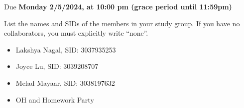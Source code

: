 \documentclass[11pt]{article}
\def\duedate{Monday 2/5/2024, at 10:00 pm (grace period until 11:59pm)}
\begin{document}
\maketitle
Due \textbf{\duedate}

List the names and SIDs of the members in your study group.
If you have no collaborators, you must explicitly write ``none''.

\begin{solution}
\begin{itemize}
    \item Lakshya Nagal, SID: 3037935253
    \item Joyce Lu, SID: 3039208707
    \item Melad Mayaar, SID: 3038197632
    \item OH and Homework Party
\end{itemize}
\end{solution}

\end{document}
